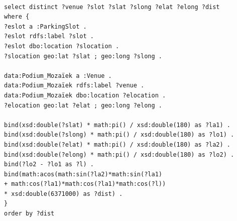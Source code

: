 \documentclass[runningheads,a4paper]{../../StyleFiles/llncs}
\begin{document}
\begin{lstlisting}[captionpos=b, caption=SPARQL query for getting parking spots close to Podium Mozaiek (sorted by distance), label=lst:sparql,
basicstyle=\ttfamily,frame=bt]

select distinct ?venue ?slot ?slat ?slong ?elat ?elong ?dist
where {
?eslot a :ParkingSlot .
?eslot rdfs:label ?slot .
?eslot dbo:location ?slocation .
?slocation geo:lat ?slat ; geo:long ?slong .

data:Podium_Mozaïek a :Venue .
data:Podium_Mozaïek rdfs:label ?venue .
data:Podium_Mozaïek dbo:location ?elocation .
?elocation geo:lat ?elat ; geo:long ?elong .

bind(xsd:double(?slat) * math:pi() / xsd:double(180) as ?la1) .
bind(xsd:double(?slong) * math:pi() / xsd:double(180) as ?lo1) .
bind(xsd:double(?elat) * math:pi() / xsd:double(180) as ?la2) .
bind(xsd:double(?elong) * math:pi() / xsd:double(180) as ?lo2) .
bind(?lo2 - ?lo1 as ?l) .
bind(math:acos(math:sin(?la2)*math:sin(?la1) 
+ math:cos(?la1)*math:cos(?la1)*math:cos(?l)) 
* xsd:double(6371000) as ?dist) .
}
order by ?dist

\end{lstlisting}
\end{document}
